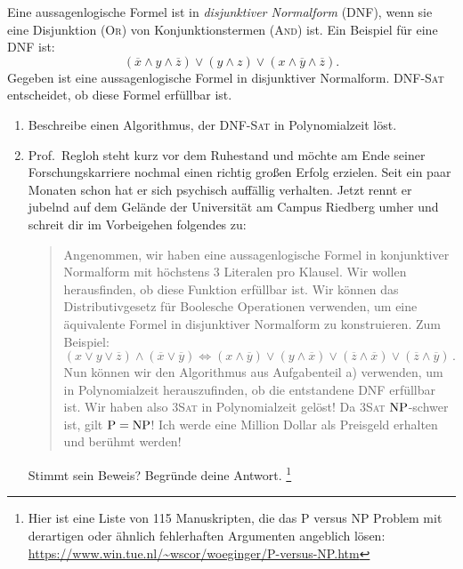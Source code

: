 \documentclass{uebung_cs}
\begin{document}
\begin{exercise}[DNF Erfüllbarkeit][\athome]
	Eine aussagenlogische Formel ist in \textit{disjunktiver Normalform} (DNF), wenn sie eine Disjunktion (\textsc{Or}) von Konjunktionstermen (\textsc{And}) ist. Ein Beispiel für eine DNF ist:
	$$(\overline{x} \wedge y \wedge \overline{z}) \vee (y \wedge z) \vee (x \wedge \overline{y} \wedge \overline{z}).$$
	Gegeben ist eine aussagenlogische Formel in disjunktiver Normalform. DNF-\textsc{Sat} entscheidet, ob diese Formel erfüllbar ist.
	\begin{enumerate}
		\item\easy Beschreibe einen Algorithmus, der DNF-\textsc{Sat} in Polynomialzeit  löst.
		\item\medium Prof.\ Regloh steht kurz vor dem Ruhestand und möchte am Ende seiner Forschungskarriere nochmal einen richtig großen Erfolg erzielen.
		Seit ein paar Monaten schon hat er sich psychisch auffällig verhalten. Jetzt rennt er jubelnd auf dem Gelände der Universität am Campus Riedberg umher und schreit dir im Vorbeigehen folgendes zu:
		      \begin{quote}
			      Angenommen, wir haben eine aussagenlogische Formel in konjunktiver Normalform mit höchstens 3 Literalen pro Klausel. Wir wollen herausfinden, ob diese Funktion erfüllbar ist. Wir können das Distributivgesetz für Boolesche Operationen verwenden, um eine äquivalente Formel in disjunktiver Normalform zu konstruieren. Zum Beispiel:
			      \[(x \vee y \vee \overline{z}) \wedge (\overline{x} \vee \overline{y}) \Leftrightarrow (x \wedge \overline{y}) \vee (y \wedge \overline{x}) \vee (\overline{z} \wedge \overline{x}) \vee (\overline{z} \wedge \overline{y})\,.\]
			      Nun können wir den Algorithmus aus Aufgabenteil a) verwenden, um in Polynomialzeit herauszufinden, ob die entstandene DNF erfüllbar ist. Wir haben also \textsc{3Sat} in Polynomialzeit gelöst! Da \textsc{3Sat} $\mathrm{NP}$-schwer ist, gilt $\mathrm{P} = \mathrm{NP}$! Ich werde eine Million Dollar als Preisgeld erhalten und berühmt werden!
		      \end{quote}
			  Stimmt sein Beweis? Begründe deine Antwort.
			  \footnote{Hier ist eine Liste von 115 Manuskripten, die das P versus NP Problem mit derartigen oder ähnlich fehlerhaften Argumenten angeblich lösen: \url{https://www.win.tue.nl/~wscor/woeginger/P-versus-NP.htm}}
	\end{enumerate}
\end{exercise}
\clearpage
\end{document}
